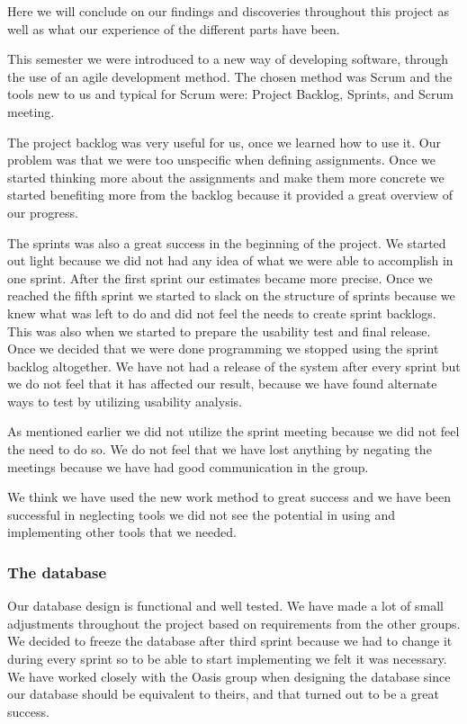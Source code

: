 Here we will conclude on our findings and discoveries throughout this project as well as what our experience of the different parts have been.

This semester we were introduced to a new way of developing software, through the use of an agile development method. 
The chosen method was Scrum and the tools new to us and typical for Scrum were: Project Backlog, Sprints, and Scrum meeting.

The project backlog was very useful for us, once we learned how to use it. Our problem was that we were too unspecific when defining assignments. Once we started thinking more about the assignments and make them more concrete we started benefiting more from the backlog because it provided a great overview of our progress.

The sprints was also a great success in the beginning of the project. We started out light because we did not had any idea of what we were able to accomplish in one sprint. After the first sprint our estimates became more precise.
Once we reached the fifth sprint we started to slack on the structure of sprints because we knew what was left to do and did not feel the needs to create sprint backlogs. This was also when we started to prepare the usability test and final release.
Once we decided that we were done programming we stopped using the sprint backlog altogether. We have not had a release of the system after every sprint but we do not feel that it has affected our result, because we have found alternate ways to test by utilizing usability analysis.

As mentioned earlier we did not utilize the sprint meeting because we did not feel the need to do so. We do not feel that we have lost anything by negating the meetings because we have had good communication in the group.

We think we have used the new work method to great success and we have been successful in neglecting tools we did not see the potential in using and implementing other tools that we needed. 
\subsubsection*{The database}
Our database design is functional and well tested. We have made a lot of small adjustments throughout the project based on requirements from the other groups. We decided to freeze the database after third sprint because we had to change it during every sprint so to be able to start implementing we felt it was necessary. We have worked closely with the Oasis group when designing the database since our database should be equivalent to theirs, and that turned out to be a great success.

